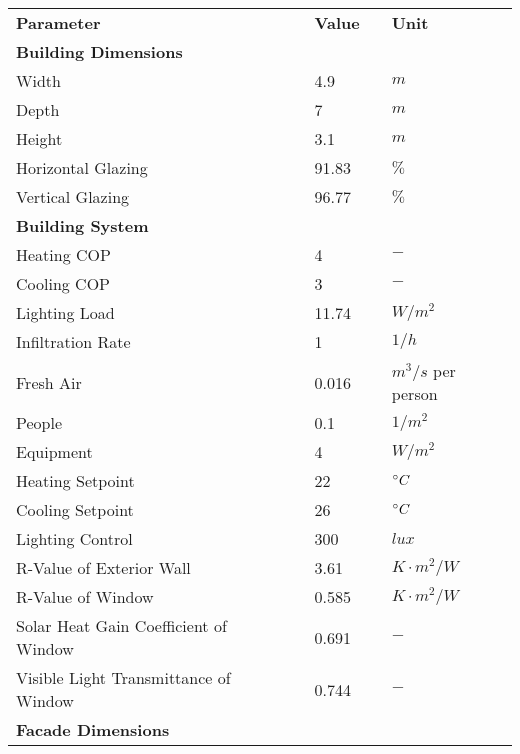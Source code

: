 		\begin{table}[h!]
		\label{t:parameters}
			\begin{center}
		    \begin{tabular}{lllll}
		    \bf Parameter            	&& \bf Value 	&& \bf Unit \\ \specialrule{.1em}{.2em}{.2em} 
		    \bf Building Dimensions 	&& ~     		&& ~    \\ \hline
		    Width 		         		&& 4.9    		&& $m$    \\
		    Depth          				&& 7     		&& $m$    \\
		    Height          			&& 3.1     		&& $m$    \\
		    Horizontal Glazing    		&& 91.83     	&& $\%$    \\
		    Vertical Glazing    		&& 96.77     	&& $\%$    \\ \hline
		    \bf Building System 		&& ~     		&& ~    \\ \hline
		    Heating COP          		&& 4     		&& $-$    \\
		    Cooling COP          		&& 3     		&& $-$    \\
		    Lighting Load          		&& 11.74     	&& $W/m^2$    \\
		    Infiltration Rate \cite{porges2001} && 1 	&& $1/h$    \\
		    Fresh Air \cite{porges2001} && 0.016		&& $m^3/s$ per person    \\
		    People		          		&& 0.1     		&& $1/m^2$    \\
		    Equipment	          		&& 4     		&& $W/m^2$    \\
		    Heating Setpoint          	&& 22     		&& $\degree C$    \\
		    Cooling Setpoint       		&& 26     		&& $\degree C$   \\
		    Lighting Control       		&& 300     		&& $lux$    \\ 
		    R-Value of Exterior Wall\footnotemark[1]
		    						 	&& 3.61     	&& $K\cdot m^2/W$    \\
		    R-Value of Window\footnotemark[2]
		    					 		&& 0.585     	&& $K\cdot m^2/W$    \\ 
		    Solar Heat Gain Coefficient of Window\footnotemark[2]	 		
		    							&& 0.691     	&& $-$    \\
		    Visible Light Transmittance of Window\footnotemark[2]
		    					 		&& 0.744     	&& $-$    \\ \hline
		    \bf Facade Dimensions 		&& ~     		&& ~    \\ \hline

\end{tabular}
\end{center}
\end{table}
